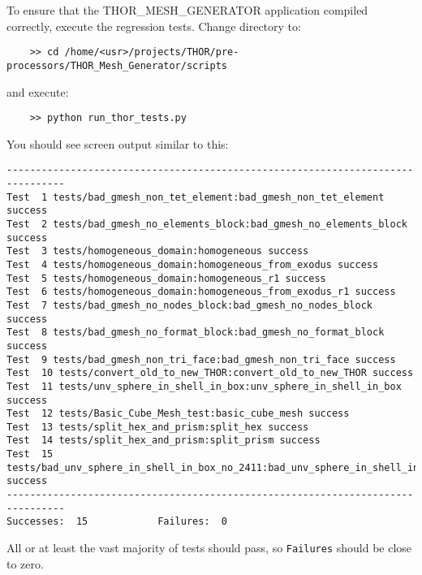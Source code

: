 To ensure that the THOR\_MESH\_GENERATOR application compiled correctly, execute the regression tests. Change directory to:
\begin{verbatim}
    >> cd /home/<usr>/projects/THOR/pre-processors/THOR_Mesh_Generator/scripts
\end{verbatim}
and execute:
\begin{verbatim}
    >> python run_thor_tests.py
\end{verbatim}
You should see screen output similar to this:
\begin{verbatim}
--------------------------------------------------------------------------------
Test  1 tests/bad_gmesh_non_tet_element:bad_gmesh_non_tet_element success
Test  2 tests/bad_gmesh_no_elements_block:bad_gmesh_no_elements_block success
Test  3 tests/homogeneous_domain:homogeneous success
Test  4 tests/homogeneous_domain:homogeneous_from_exodus success
Test  5 tests/homogeneous_domain:homogeneous_r1 success
Test  6 tests/homogeneous_domain:homogeneous_from_exodus_r1 success
Test  7 tests/bad_gmesh_no_nodes_block:bad_gmesh_no_nodes_block success
Test  8 tests/bad_gmesh_no_format_block:bad_gmesh_no_format_block success
Test  9 tests/bad_gmesh_non_tri_face:bad_gmesh_non_tri_face success
Test  10 tests/convert_old_to_new_THOR:convert_old_to_new_THOR success
Test  11 tests/unv_sphere_in_shell_in_box:unv_sphere_in_shell_in_box success
Test  12 tests/Basic_Cube_Mesh_test:basic_cube_mesh success
Test  13 tests/split_hex_and_prism:split_hex success
Test  14 tests/split_hex_and_prism:split_prism success
Test  15 tests/bad_unv_sphere_in_shell_in_box_no_2411:bad_unv_sphere_in_shell_in_box_no_2411 success
--------------------------------------------------------------------------------
Successes:  15            Failures:  0
\end{verbatim}
All or at least the vast majority of tests should pass, so \verb"Failures" should be close to zero.